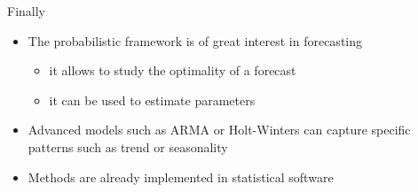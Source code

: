 \documentclass{beamer}
\begin{document}
\begin{frame}{}
Finally
\vspace{2mm}
\begin{itemize}
	\item The probabilistic framework is of great interest in forecasting
	\begin{itemize}
	 	\item it allows to study the optimality of a forecast
	 	\item it can be used to estimate parameters
	\end{itemize}  \vspace{2mm}
	\item Advanced models such as ARMA or Holt-Winters can capture specific patterns such as trend or seasonality \vspace{2mm}
	\item Methods are already implemented in statistical software
\end{itemize}
\end{frame}
\end{document}
